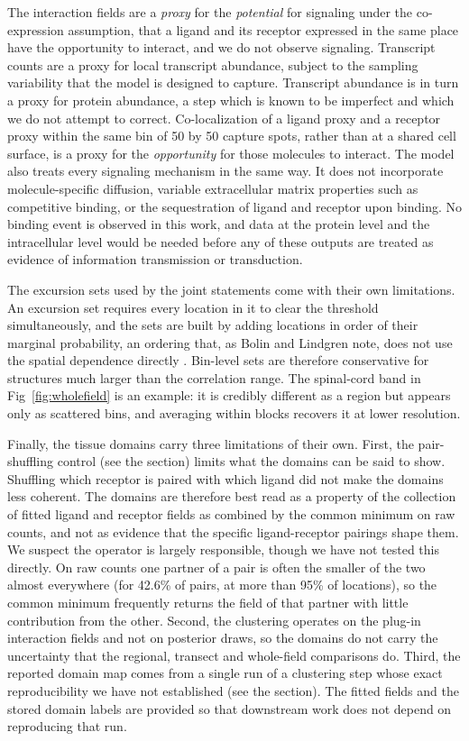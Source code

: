 \documentclass[10pt,letterpaper]{article}
\begin{document}
The interaction fields are a \textit{proxy} for the \textit{potential} for signaling under the co-expression assumption, that a ligand and its receptor expressed in the same place have the opportunity to interact, and we do not observe signaling. Transcript counts are a proxy for local transcript abundance, subject to the sampling variability that the model is designed to capture. Transcript abundance is in turn a proxy for protein abundance, a step which is known to be imperfect and which we do not attempt to correct. Co-localization of a ligand proxy and a receptor proxy within the same bin of 50 by 50 capture spots, rather than at a shared cell surface, is a proxy for the \textit{opportunity} for those molecules to interact. The model also treats every signaling mechanism in the same way. It does not incorporate molecule-specific diffusion, variable extracellular matrix properties such as competitive binding, or the sequestration of ligand and receptor upon binding. No binding event is observed in this work, and data at the protein level and the intracellular level would be needed before any of these outputs are treated as evidence of information transmission or transduction.

The excursion sets used by the joint statements come with their own limitations. An excursion set requires every location in it to clear the threshold simultaneously, and the sets are built by adding locations in order of their marginal probability, an ordering that, as Bolin and Lindgren note, does not use the spatial dependence directly \cite{bolin2015excursion}. Bin-level sets are therefore conservative for structures much larger than the correlation range. The spinal-cord band in Fig~\ref{fig:wholefield} is an example: it is credibly different as a region but appears only as scattered bins, and averaging within blocks recovers it at lower resolution.

Finally, the tissue domains carry three limitations of their own. First, the pair-shuffling control (see the  section) limits what the domains can be said to show. Shuffling which receptor is paired with which ligand did not make the domains less coherent. The domains are therefore best read as a property of the collection of fitted ligand and receptor fields as combined by the common minimum on raw counts, and not as evidence that the specific ligand-receptor pairings shape them. We suspect the operator is largely responsible, though we have not tested this directly. On raw counts one partner of a pair is often the smaller of the two almost everywhere (for 42.6\% of pairs, at more than 95\% of locations), so the common minimum frequently returns the field of that partner with little contribution from the other. Second, the clustering operates on the plug-in interaction fields and not on posterior draws, so the domains do not carry the uncertainty that the regional, transect and whole-field comparisons do. Third, the reported domain map comes from a single run of a clustering step whose exact reproducibility we have not established (see the  section). The fitted fields and the stored domain labels are provided so that downstream work does not depend on reproducing that run.
\end{document}

